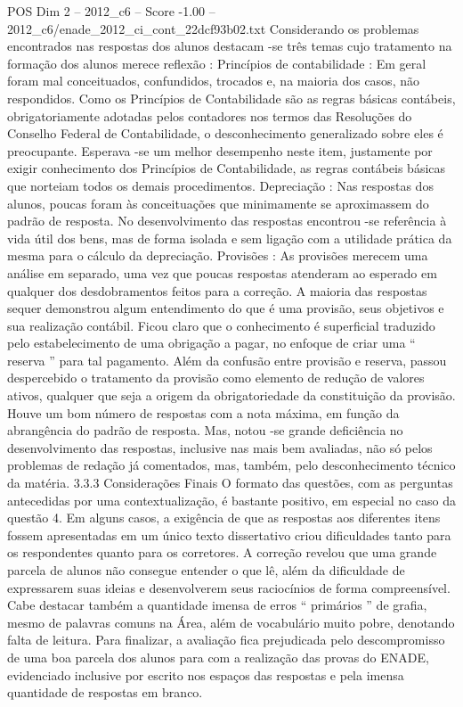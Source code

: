 \begin{textsample}{POS Dim 2 – 2012\_c6 – Score -1.00 – 2012\_c6/enade\_2012\_ci\_cont\_22dcf93b02.txt}
Considerando os problemas encontrados nas respostas dos alunos destacam -se três temas cujo tratamento na formação dos alunos merece reflexão : Princípios de contabilidade : Em geral foram mal conceituados, confundidos, trocados e, na maioria dos casos, não respondidos.
Como os Princípios de Contabilidade são as regras básicas contábeis, obrigatoriamente adotadas pelos contadores nos termos das Resoluções do Conselho Federal de Contabilidade, o desconhecimento generalizado sobre eles é preocupante.
Esperava -se um melhor desempenho neste item, justamente por exigir conhecimento dos Princípios de Contabilidade, as regras contábeis básicas que norteiam todos os demais procedimentos.
Depreciação : Nas respostas dos alunos, poucas foram às conceituações que minimamente se aproximassem do padrão de resposta.
No desenvolvimento das respostas encontrou -se referência à vida útil dos bens, mas de forma isolada e sem ligação com a utilidade prática da mesma para o cálculo da depreciação.
Provisões : As provisões merecem uma análise em separado, uma vez que poucas respostas atenderam ao esperado em qualquer dos desdobramentos feitos para a correção.
A maioria das respostas sequer demonstrou algum entendimento do que é uma provisão, seus objetivos e sua realização contábil.
Ficou claro que o conhecimento é superficial traduzido pelo estabelecimento de uma obrigação a pagar, no enfoque de criar uma “ reserva ” para tal pagamento.
Além da confusão entre provisão e reserva, passou despercebido o tratamento da provisão como elemento de redução de valores ativos, qualquer que seja a origem da obrigatoriedade da constituição da provisão.
Houve um bom número de respostas com a nota máxima, em função da abrangência do padrão de resposta.
Mas, notou -se grande deficiência no desenvolvimento das respostas, inclusive nas mais bem avaliadas, não só pelos problemas de redação já comentados, mas, também, pelo desconhecimento técnico da matéria. 3.3.3 Considerações Finais O formato das questões, com as perguntas antecedidas por uma contextualização, é bastante positivo, em especial no caso da questão 4.
Em alguns casos, a exigência de que as respostas aos diferentes itens fossem apresentadas em um único texto dissertativo criou dificuldades tanto para os respondentes quanto para os corretores.
A correção revelou que uma grande parcela de alunos não consegue entender o que lê, além da dificuldade de expressarem suas ideias e desenvolverem seus raciocínios de forma compreensível.
Cabe destacar também a quantidade imensa de erros “ primários ” de grafia, mesmo de palavras comuns na Área, além de vocabulário muito pobre, denotando falta de leitura.
Para finalizar, a avaliação fica prejudicada pelo descompromisso de uma boa parcela dos alunos para com a realização das provas do ENADE, evidenciado inclusive por escrito nos espaços das respostas e pela imensa quantidade de respostas em branco.

\end{textsample}
